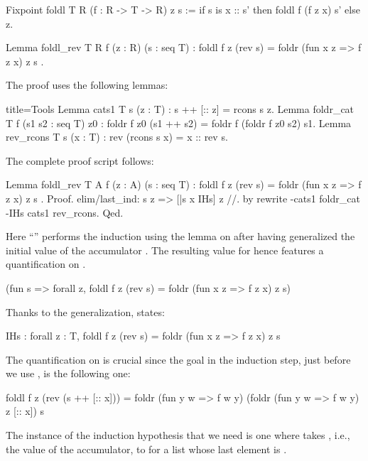 \begin{coq}{}{}
Fixpoint foldl T R (f : R -> T -> R) z s :=
  if s is x :: s' then foldl f (f z x) s' else z.

Lemma foldl_rev T R f (z : R) (s : seq T) :
  foldl f z (rev s) = foldr (fun x z => f z x) z s .
\end{coq}

The proof uses the following lemmas:

\begin{coq}{}{title=Tools}
Lemma cats1 T s (z : T) : s ++ [:: z] = rcons s z.
Lemma foldr_cat T f (s1 s2 : seq T) z0 :
  foldr f z0 (s1 ++ s2) = foldr f (foldr f z0 s2) s1.
Lemma rev_rcons T s (x : T) : rev (rcons s x) = x :: rev s.
\end{coq}

The complete proof script follows:

\begin{coq}{}{}
Lemma foldl_rev T A f (z : A) (s : seq T) :
  foldl f z (rev s) = foldr (fun x z => f z x) z s .
Proof.
elim/last_ind: s z => [|s x IHs] z //.
by rewrite -cats1 foldr_cat -IHs cats1 rev_rcons.
Qed.
\end{coq}

Here ``'' performs the induction using the
 lemma on  after having generalized the initial value of
the accumulator .  The resulting value for  hence
features a quantification on .

\begin{coq}{}{}
(fun s => forall z, foldl f z (rev s) = foldr (fun x z => f z x) z s)
\end{coq}

Thanks to the generalization,  states:

\begin{coq}{}{}
IHs : forall z : T, foldl f z (rev s) = foldr (fun x z => f z x) z s
\end{coq}
The quantification on  is crucial since the goal in the induction step,
just before we use , is the following one:

\begin{coqout}{}{}
foldl f z (rev (s ++ [:: x])) =
  foldr (fun y w => f w y) (foldr (fun y w => f w y) z [:: x]) s
\end{coqout}

The instance of the induction hypothesis that we need is
one where  takes ,
i.e., the value of the accumulator, to  for a list
whose last element is .

